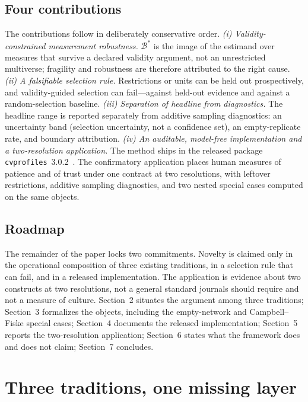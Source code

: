 \documentclass[10pt,letterpaper]{article}
\newcommand{\cvp}{\texttt{cvprofiles}}
\newcommand{\Bset}{\mathcal{B}}
\begin{document}
\subsection{Four contributions}
The contributions follow in deliberately conservative order.
\textit{(i) Validity-constrained measurement robustness.}
$\Bset^*$ is the image of the estimand over measures that survive a declared validity argument, not an unrestricted multiverse; fragility and robustness are therefore attributed to the right cause.
\textit{(ii) A falsifiable selection rule.}
Restrictions or units can be held out prospectively, and validity-guided selection can fail---against held-out evidence and against a random-selection baseline.
\textit{(iii) Separation of headline from diagnostics.}
The headline range is reported separately from additive sampling diagnostics: an uncertainty band (selection uncertainty, not a confidence set), an empty-replicate rate, and boundary attribution.
\textit{(iv) An auditable, model-free implementation and a two-resolution application.}
The method ships in the released package \cvp{}~3.0.2~\cite{cvprofiles}.
The confirmatory application places human measures of patience and of trust under one contract at two resolutions, with leftover restrictions, additive sampling diagnostics, and two nested special cases computed on the same objects.

\subsection{Roadmap}
The remainder of the paper locks two commitments.
Novelty is claimed only in the operational composition of three existing traditions, in a selection rule that can fail, and in a released implementation.
The application is evidence about two constructs at two resolutions, not a general standard journals should require and not a measure of culture.
Section~2 situates the argument among three traditions; Section~3 formalizes the objects, including the empty-network and Campbell--Fiske special cases; Section~4 documents the released implementation; Section~5 reports the two-resolution application; Section~6 states what the framework does and does not claim; Section~7 concludes.

\section{Three traditions, one missing layer}
\label{sec:traditions}
\end{document}
